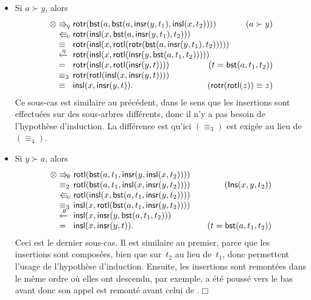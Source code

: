 \begin{itemize}
\begin{itemize}
    \item Si \(a \succ y\), alors
\begin{equation*}
\begin{array}{@{}r@{\;}l@{\;}l@{\hspace{-9mm}}r@{}}
  \otimes & \Rra{\eta} & \fun{rotr}(\fun{bst}(a,
  \fun{bst}(a,\fun{insr}(y,t_1),\fun{insl}(x,t_2))))
  & (a \succ y)\\
  & \Lla{\upsilon} &
  \fun{rotr}(\fun{insl}(x,\fun{bst}(a,\fun{insr}(y,t_1),t_2)))\\
  & \equiv & \fun{rotr}(\fun{insl}(x, 
  \fun{rotl}(\fun{rotr}(\fun{bst}(a,\fun{insr}(y,t_1),t_2)))))\\
  & \xleftarrow{\smash{\eta}} &
  \fun{rotr}(\fun{insl}(x,\fun{rotl}(\fun{insr}(y, 
  \fun{bst}(a,t_1,t_2)))))\\
  & = & \fun{rotr}(\fun{insl}(x,\fun{rotl}(\fun{insr}(y,t))))
  & (t=\fun{bst}(a,t_1,t_2))\\
  & \equiv_3 &
  \fun{rotr}(\fun{rotl}(\fun{insl}(x,\fun{insr}(y,t))))\\
  & \equiv & \fun{insl}(x,\fun{insr}(y,t)).
  & (\fun{rotr}(\fun{rotl}(z)) \equiv z)
\end{array}
\end{equation*}
Ce sous-cas est similaire au précédent, dans le sens que les
insertions sont effectuées sur des sous-arbres différents, donc il n'y
a pas besoin de l'hypothèse d'induction. La différence est qu'ici
\((\equiv_3)\) est exigée au lieu de \((\equiv_4)\).

  \item Si \(y \succ a\), alors
\begin{equation*}
\begin{array}{@{}r@{\;}l@{\;}l@{\qquad}r@{}}
  \otimes & \Rra{\theta} & 
  \fun{rotl}(\fun{bst}(a,t_1,\fun{insr}(y,\fun{insl}(x,t_2))))\\
  & \equiv_2 & \fun{rotl}(\fun{bst}(a,t_1,\fun{insl}(x,
  \fun{insr}(y,t_2)))) & (\pred{Ins}{x,y,t_2})\\
  & \Lla{\upsilon} &
  \fun{rotl}(\fun{insl}(x,\fun{bst}(a,t_1,\fun{insr}(y,t_2))))\\
  & \equiv_3 & \fun{insl}(x,\fun{rotl}(\fun{bst}(a,t_1,
  \fun{insr}(y,t_2))))\\
  & \xleftarrow{\smash{\theta}} & \fun{insl}(x,\fun{insr}(y,
  \fun{bst}(a,t_1,t_2)))\\
  & = & \fun{insl}(x,\fun{insr}(y,t)). & (t=\fun{bst}(a,t_1,t_2))
\end{array}
\end{equation*}
Ceci est le dernier sous-cas. Il est similaire au premier, parce que
les insertions sont composées, bien que sur~\(t_2\) au lieu
de~\(t_1\), donc permettent l'usage de l'hypothèse
d'induction. Ensuite, les insertions sont remontées dans le même ordre
où elles ont descendu, par exemple,  a été poussé vers le
bas avant  donc son appel est remonté avant celui de
.\hfill\(\Box\)
  \end{itemize}

\end{itemize}

